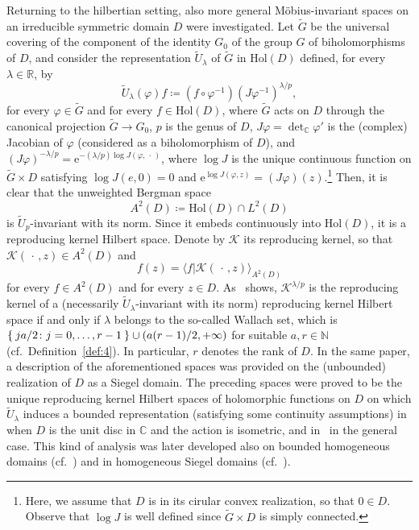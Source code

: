 \documentclass[10.5pt,reqno]{amsart}
\newcommand{\Hol}{\mathrm{Hol}}
\newcommand{\ee}{\mathrm{e}}
\newcommand{\N}{\mathds{N}}
\newcommand{\C}{\mathds{C}}
\newcommand{\R}{\mathds{R}}
\newcommand{\Kc}{\mathcal{K}}
\renewcommand{\phi}{\varphi}
\begin{document}
Returning to the hilbertian setting, also more general M\"obius-invariant spaces on an irreducible symmetric domain $D$ were investigated. Let $\widetilde G$ be the universal covering of the component of the identity $G_0$ of the group $G$ of  biholomorphisms of $D$, and consider the representation $\widetilde U_\lambda$ of $\widetilde G$ in $\Hol(D)$ defined, for every $\lambda\in \R$, by
\[
\widetilde U_\lambda(\phi) f \coloneqq (f\circ \phi^{-1}) (J\phi^{-1})^{\lambda/p},
\]
for every $\phi \in \widetilde G$ and for every $f\in \Hol(D)$, where $ \widetilde G$ acts on $D$ through the canonical projection $\widetilde G\to G_0$, $p$ is the genus of $D$, $J\phi=\det_\C\phi'$ is the (complex) Jacobian of $\phi$ (considered as a biholomorphism of $D$), and $(J\phi)^{-\lambda/p}=\ee^{-(\lambda/p) \log J( \phi,\,\cdot\,)}$, where $\log J$ is the unique continuous function on $\widetilde G\times D $ satisfying $\log J(e, 0)=0$ and $\ee^{\log J(\phi,z)}=(J \phi)(z)$.\footnote{Here, we assume that $D$ is in its cirular convex realization, so that $0\in D$. Observe that $\log J$ is well defined since $\widetilde G\times D$ is simply connected.}
Then, it is clear that the unweighted Bergman space 
\[
A^2(D)\coloneqq\Hol(D)\cap L^2(D)
\]
is $\widetilde U_p$-invariant with its norm. Since it embeds continuously into $\Hol(D)$, it is a reproducing kernel Hilbert space. Denote by $\Kc$ its reproducing kernel, so that $\Kc(\,\cdot\,,z)\in A^2(D)$ and
\[
f(z)=\langle f\vert \Kc(\,\cdot\,,z)\rangle_{A^2(D)}
\]
for every $f\in A^2(D)$ and for every $z\in D$. As~\cite{VergneRossi} shows, $\Kc^{\lambda/p}$ is the reproducing kernel of  a  (necessarily $\widetilde U_\lambda$-invariant with its norm) reproducing kernel Hilbert space  if and only if $\lambda$ belongs to the so-called Wallach set, which is $\Set{j a/2\colon j=0,\dots, r-1}\cup (a(r-1)/2, +\infty)$ for  suitable   $a,r\in\N$ (cf.~Definition~\ref{def:4}). In particular, $r$ denotes the rank of $D$. In the same paper, a description of the aforementioned spaces was provided on the (unbounded) realization of $D$ as a Siegel domain.
The preceding spaces were proved to be the unique reproducing kernel Hilbert spaces of holomorphic functions on $D$ on which $\widetilde U_\lambda$ induces a bounded representation (satisfying some  continuity assumptions) in~\cite{ArazyFisher3} when $D$ is the unit disc in $\C$ and the action is isometric, and in~\cite[Theorem 3]{ArazyFisher2} in the general case. This kind of analysis was later developed also on bounded homogeneous domains (cf.~\cite{Ishi6}) and in homogeneous Siegel domains (cf.~\cite{Ishi3,Ishi4,Ishi5}).
\end{document}
